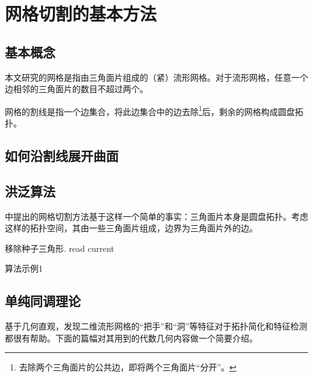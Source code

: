 
\chapter{网格切割的基本方法}

\section{基本概念}

本文研究的网格是指由三角面片组成的（紧）流形网格。对于流形网格，任意一个边相邻的三角面片的数目不超过两个。

网格的割线是指一个边集合，将此边集合中的边去除\footnote{去除两个三角面片的公共边，即将两个三角面片“分开”。}后，剩余的网格构成圆盘拓扑。

\section{如何沿割线展开曲面}



\section{洪泛算法}

\citet{Gu2002} 中提出的网格切割方法基于这样一个简单的事实：三角面片本身是圆盘拓扑。考虑这样的拓扑空间，其由一些三角面片组成，边界为三角面片外的边。

\begin{algorithm}[h]
    \SetAlgoLined
  
    移除种子三角形.
     {
      read current\;
    }
    \caption{算法示例1}
\end{algorithm}
  

\section{单纯同调理论}

\citet{oncomputinghantun} 基于几何直观，发现二维流形网格的“把手”和“洞”等特征对于拓扑简化和特征检测都很有帮助。下面的篇幅对其用到的代数几何内容做一个简要介绍。
